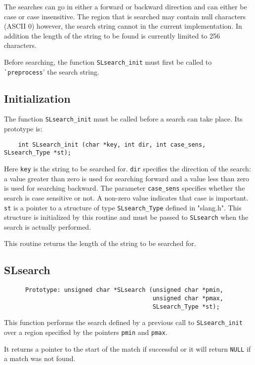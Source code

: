  The searches can go in either a forward or backward direction and can
 either be case or case insensitive.  The region that is searched may
 contain null characters (ASCII 0) however, the search string cannot in the
 current implementation.  In addition the length of the string to be found
 is currently limited to 256 characters.
 
 Before searching, the function \verb|SLsearch_init| must first be called to
 \verb|`preprocess|' the search string.
 

\subsection{Initialization} %
 The function \verb|SLsearch_init| must be called before a search can take place.
 Its prototype is:
\begin{verbatim}  
    int SLsearch_init (char *key, int dir, int case_sens, SLsearch_Type *st);
\end{verbatim} 
 Here \verb|key| is the string to be searched for.  \verb|dir| specifies the direction
 of the search: a value greater than zero is used for searching forward and
 a value less than zero is used for searching backward.  The parameter
 \verb|case_sens| specifies whether the search is case sensitive or not.  A
 non-zero value indicates that case is important.  \verb|st| is a pointer to a
 structure of type \verb|SLsearch_Type| defined in "slang.h".  This structure is
 initialized by this routine and must be passed to \verb|SLsearch| when the
 search is actually performed.
 
 This routine returns the length of the string to be searched for.


\subsection{SLsearch} %

\begin{verbatim} 
      Prototype: unsigned char *SLsearch (unsigned char *pmin, 
                                          unsigned char *pmax, 
                                          SLsearch_Type *st);
\end{verbatim} 

 This function performs the search defined by a previous call to
 \verb|SLsearch_init| over a region specified by the pointers
 \verb|pmin| and \verb|pmax|.

 It returns a pointer to the start of the match if successful or it will
 return \verb|NULL| if a match was not found.
  




